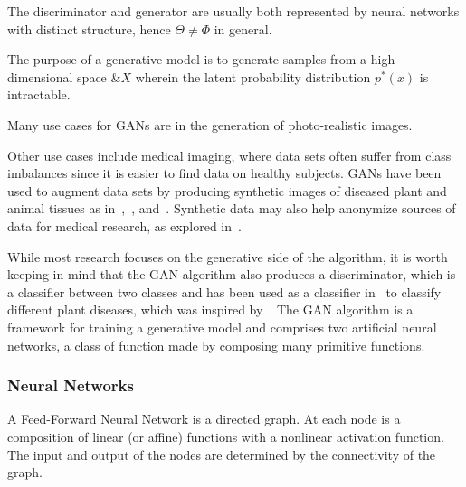 The discriminator and generator are usually both represented by neural
networks with distinct structure, hence $\Theta \not = \Phi$ in
general.

The purpose of a generative model is to generate samples from a high
dimensional space $\&X$ wherein the latent probability distribution
$p^*(x)$ is intractable.

Many use cases for GANs are in the generation
of photo-realistic images.

Other use cases include medical imaging, where data sets often suffer
from class imbalances since it is easier to find data on healthy
subjects. GANs have been used to augment data sets by producing
synthetic images of diseased plant and animal tissues as
in~\cite{ref:nazki-2018},~\cite{ref:valerio-2017},
and~\cite{ref:frid-2018}. Synthetic data may also help anonymize
sources of data for medical research, as explored
in~\cite{ref:shin-2018}.

While most research focuses on the generative side of the algorithm,
it is worth keeping in mind that the GAN algorithm also produces a
discriminator, which is a classifier between two classes and has been
used as a classifier in~\cite{ref:cortes-2017} to classify different
plant diseases, which was inspired by~\cite{ref:odena-2016}.  The GAN
algorithm is a framework for training a generative model and comprises
two artificial neural networks, a class of function made by composing
many primitive functions.

\subsubsection*{Neural Networks}

\begin{definition}
  A \textnormal{\sffamily Feed-Forward Neural Network} is a directed
  graph. At each node is a composition of linear (or affine)
  functions with a nonlinear activation function. The input and output
  of the nodes are determined by the connectivity of the graph.
\end{definition}

